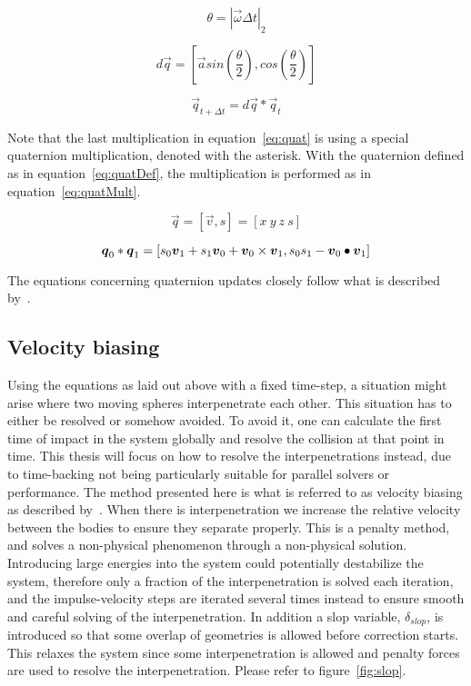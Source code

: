 \begin{equation}
  \theta = |\vec{\omega}\Delta t|_2
\end{equation}

\begin{equation}
  d\vec{q} = [\vec{a} sin(\frac{\theta}{2}),cos(\frac{\theta}{2})]
\end{equation}

\begin{equation}\label{eq:quat}
  \vec{q}_{t+\Delta t} = d\vec{q}*\vec{q}_t
\end{equation}

Note that the last multiplication in equation~\ref{eq:quat} is using a special quaternion multiplication, denoted with the asterisk.
With the quaternion defined as in equation~\ref{eq:quatDef}, the multiplication is performed as in equation~\ref{eq:quatMult}.

\begin{equation}\label{eq:quatDef}
  \vec{q} = [\vec{v},s] = [x\ y\ z\ s]
\end{equation}

\begin{equation}\label{eq:quatMult}
  \boldsymbol{q}_0*\boldsymbol{q}_1 = [s_0\boldsymbol{v}_1+s_1\boldsymbol{v}_0+\boldsymbol{v}_0\times \boldsymbol{v}_1,s_0s_1-\boldsymbol{v}_0\bullet \boldsymbol{v}_1]
\end{equation}

The equations concerning quaternion updates closely follow what is described by~\cite{fossum}.
\subsection{Velocity biasing}\label{sec:bias}
Using the equations as laid out above with a fixed time-step, a situation might arise
where two moving spheres interpenetrate each other. This situation has to either be resolved or somehow avoided.
To avoid it, one can calculate the first time of impact in the system globally and
resolve the collision at that point in time. This thesis will focus on how to resolve
the interpenetrations instead, due to time-backing not being particularly suitable
for parallel solvers or performance.
The method presented here is what is referred to as velocity biasing as described by~\cite{catto2006}.
When there is interpenetration we increase the relative velocity between the bodies
to ensure they separate properly. This is a penalty method, and solves a non-physical
phenomenon through a non-physical solution. Introducing large energies into the
system could potentially destabilize the system, therefore only a fraction of the
interpenetration is solved each iteration, and the impulse-velocity steps are iterated
several times instead to ensure smooth and careful solving of the interpenetration.
In addition a slop variable, $\delta_{slop}$, is introduced so that some overlap of geometries
is allowed before correction starts. This relaxes the system since some interpenetration is
allowed and penalty forces are used to resolve the interpenetration.
Please refer to figure~\ref{fig:slop}.

